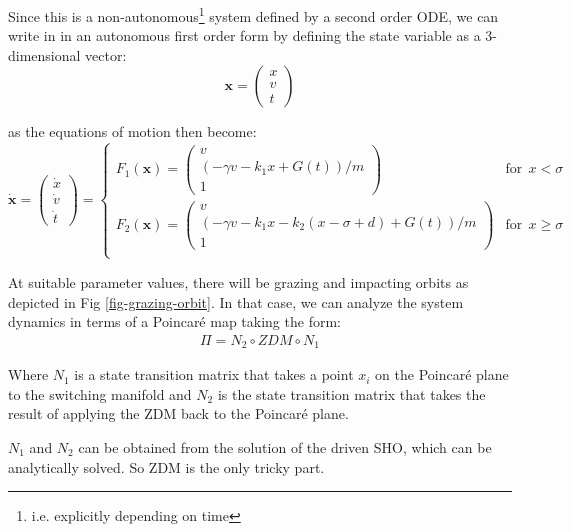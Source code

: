 \documentclass{book}
\renewcommand{\(}{\begin{columns}}
\renewcommand{\)}{\end{columns}}
\newcommand{\<}[1]{\begin{column}{#1}}
\renewcommand{\>}{\end{column}}
\newcommand{\mb}[1]{\mathbf{#1}}
\begin{document}
Since this is a non-autonomous\footnote{i.e. explicitly depending on time} 
system defined by a second order ODE, we can write in in an autonomous first 
order form by 
defining the state variable as a 3-dimensional vector:
\begin{equation}
\label{def-statevec}
\mb{x}=
\begin{pmatrix}
x\\
v\\
t
\end{pmatrix}
\end{equation}

as the equations of motion then become:
\begin{equation}
\label{eq-softimp-3d}
\dot{\mb{x}}=
\begin{pmatrix}
\dot{x}\\
\dot{v}\\
\dot{t}
\end{pmatrix}
=
\begin{cases}
F_1(\mb{x})=
\begin{pmatrix}
v\\
(-\gamma v-k_1x+G(t))/m\\
1
\end{pmatrix}&\mathrm{for}~~x<\sigma\\
F_2(\mb{x})=
\begin{pmatrix}
v\\
(-\gamma v-k_1x-k_2(x-\sigma+d)+G(t))/m\\
1
\end{pmatrix}&\mathrm{for}~~x\geq\sigma\\
\end{cases}
\end{equation}

At suitable parameter values, there will be grazing and impacting orbits as 
depicted in Fig \ref{fig-grazing-orbit}. In that case, we can analyze the system 
dynamics in terms of a Poincaré map taking the form:
\begin{align}
\label{eq-pmap-composed}
\Pi=N_2\circ ZDM\circ N_1
\end{align}

Where $N_1$ is a state transition matrix that takes a point $x_i$ on the 
Poincaré plane to the switching manifold and $N_2$ is the state transition 
matrix that takes  the result of applying the ZDM back to the Poincaré plane.  

$N_1$ and $N_2$ can be obtained from the solution of the driven SHO, which can 
be analytically solved.  So ZDM is the only tricky part. 
\end{document}
